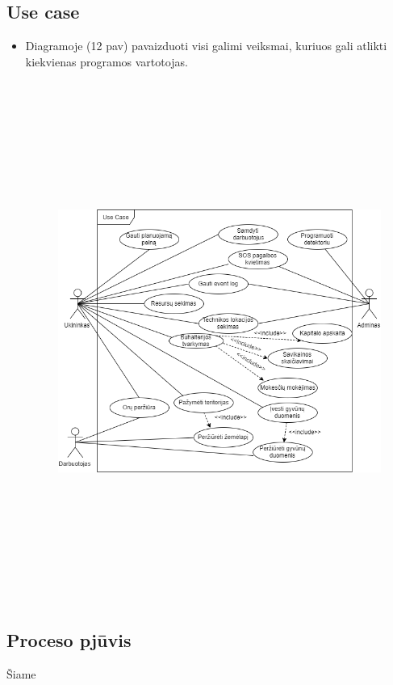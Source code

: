 \documentclass[oneside]{VUMIFPSkursinis}
\begin{document}
\subsection{Use case}
\begin{itemize}
\item Diagramoje (12 pav) pavaizduoti visi galimi veiksmai, kuriuos gali atlikti kiekvienas programos vartotojas.
		\begin{figure}[H]
		\centering	
	\includegraphics[width=15cm,height=17cm,keepaspectratio]{UseCaseFull.png}
	\caption{}
	\label{fig:UseCaseFull}
\end{figure}
\end{itemize}
\subsection{Proceso pjūvis}
Šiame 
\end{document}
